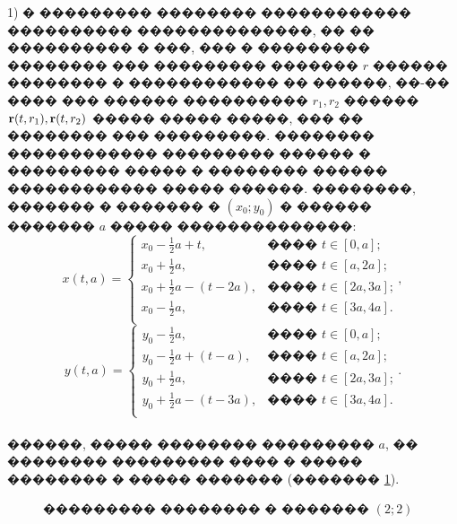 \documentclass[a4paper]{article}
\begin{document}
  1) � ��������� �������� ������������ ���������� ��������������, �� �� ���������� � ���, ��� � ��������� �������� ��� ��������� ������� $r$ ������ �������� � ������������ �� ������, ��-�� ���� ��� ������ ���������� $r_1,r_2$ ������ ${\bf r}(t,r_1),{\bf r}(t,r_2)$ ����� ����� �����, ��� �� �������� ��� ���������.
        �������� ������������ ��������� ������ � ��������� ����� � �������� ������ ������������ ����� ������. ��������, ������� � ������� � $(x_0;y_0)$ � ������ ������� $a$ ����� ��������������:
        \[
          x(t,a) =
          \begin{cases}
            x_0-\frac{1}{2}a+t,      & \text{���� $t \in [0,a]$;}   \\
            x_0+\frac{1}{2}a,        & \text{���� $t \in [a,2a]$;}  \\
            x_0+\frac{1}{2}a-(t-2a), & \text{���� $t \in [2a,3a]$;} \\
            x_0-\frac{1}{2}a,        & \text{���� $t \in [3a,4a]$.} \\
          \end{cases},
        \]
        \[
          y(t,a) =
          \begin{cases}
            y_0-\frac{1}{2}a,        & \text{���� $t \in [0,a]$;}   \\
            y_0-\frac{1}{2}a+(t-a),  & \text{���� $t \in [a,2a]$;}  \\
            y_0+\frac{1}{2}a,        & \text{���� $t \in [2a,3a]$;} \\
            y_0+\frac{1}{2}a-(t-3a), & \text{���� $t \in [3a,4a]$.} \\
          \end{cases}.
        \]
        \\
        ������, ����� �������� ��������� $a$, �� �������� ��������� ���� � ����� �������� � ����� ������� (������� \ref{rects}).
        \begin{figure}[h!]
          \noindent{}
          \caption{��������� �������� � ������� $(2;2)$}
          \label{rects}
        \end{figure}
\end{document}
